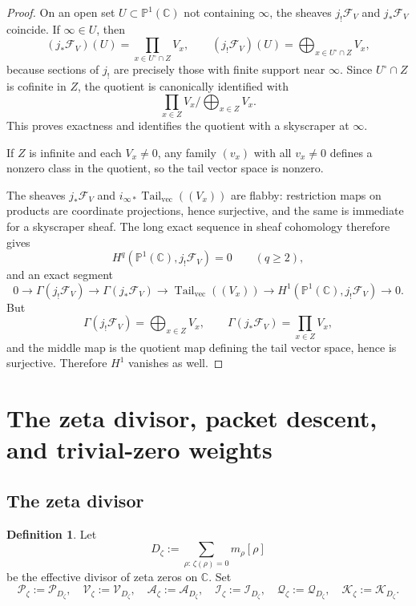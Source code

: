 \documentclass[11pt,a4paper]{article}
\theoremstyle{definition}
\newtheorem{definition}[theorem]{Definition}
\theoremstyle{remark}
\DeclareMathOperator{\Tail}{Tail}
\newcommand{\CC}{\mathbb C}
\newcommand{\PP}{\mathbb P}
\newcommand{\cP}{\mathcal P}
\newcommand{\cV}{\mathcal V}
\newcommand{\cA}{\mathcal A}
\newcommand{\cQ}{\mathcal Q}
\newcommand{\cK}{\mathcal K}
\newcommand{\cI}{\mathcal I}
\begin{document}
\begin{proof}
On an open set $U\subset\PP^1(\CC)$ not containing $\infty$, the sheaves $j_!\mathcal F_V$ and $j_*\mathcal F_V$ coincide.  If $\infty\in U$, then
\[
(j_*\mathcal F_V)(U)=\prod_{x\in U^\circ\cap Z}V_x,
\qquad
(j_!\mathcal F_V)(U)=\bigoplus_{x\in U^\circ\cap Z}V_x,
\]
because sections of $j_!$ are precisely those with finite support near $\infty$.  Since $U^\circ\cap Z$ is cofinite in $Z$, the quotient is canonically identified with
\[
\prod_{x\in Z}V_x\Big/\bigoplus_{x\in Z}V_x.
\]
This proves exactness and identifies the quotient with a skyscraper at $\infty$.

If $Z$ is infinite and each $V_x\neq0$, any family $(v_x)$ with all $v_x\neq0$ defines a nonzero class in the quotient, so the tail vector space is nonzero.

The sheaves $j_*\mathcal F_V$ and $i_{\infty*}\Tail_{\mathrm{vec}}((V_x))$ are flabby: restriction maps on products are coordinate projections, hence surjective, and the same is immediate for a skyscraper sheaf.  The long exact sequence in sheaf cohomology therefore gives
\[
H^q(\PP^1(\CC),j_!\mathcal F_V)=0\qquad(q\ge2),
\]
and an exact segment
\[
0\to \Gamma(j_!\mathcal F_V)\to \Gamma(j_*\mathcal F_V)\to \Tail_{\mathrm{vec}}((V_x))\to H^1(\PP^1(\CC),j_!\mathcal F_V)\to0.
\]
But
\[
\Gamma(j_!\mathcal F_V)=\bigoplus_{x\in Z}V_x,
\qquad
\Gamma(j_*\mathcal F_V)=\prod_{x\in Z}V_x,
\]
and the middle map is the quotient map defining the tail vector space, hence is surjective.  Therefore $H^1$ vanishes as well.
\end{proof}

\section{The zeta divisor, packet descent, and trivial-zero weights}

\subsection{The zeta divisor}

\begin{definition}
Let
\[
D_\zeta:=\sum_{\rho:\,\zeta(\rho)=0}m_\rho[\rho]
\]
be the effective divisor of zeta zeros on $\CC$.  Set
\[
\cP_\zeta:=\cP_{D_\zeta},\quad
\cV_\zeta:=\cV_{D_\zeta},\quad
\cA_\zeta:=\cA_{D_\zeta},\quad
\cI_\zeta:=\cI_{D_\zeta},\quad
\cQ_\zeta:=\cQ_{D_\zeta},\quad
\cK_\zeta:=\cK_{D_\zeta}.
\]
\end{definition}
\end{document}

